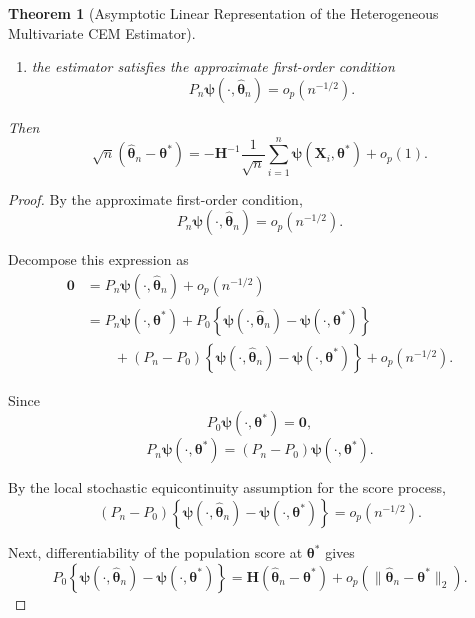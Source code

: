 \documentclass[pdflatex,sn-mathphys-ay]{sn-jnl}%
\let\oldtheta\theta
\renewcommand{\theta}{\boldsymbol{\oldtheta}}
\theoremstyle{thmstyleone}%
\newtheorem{theorem}{Theorem}%
\theoremstyle{thmstyletwo}%
\theoremstyle{thmstylethree}%
\begin{document}
\begin{theorem}[Asymptotic Linear Representation of the Heterogeneous Multivariate CEM Estimator]
\begin{enumerate}
\item
the estimator satisfies the approximate first-order condition
\[
    P_n
    \boldsymbol{\psi}
    (\cdot,\widehat{\boldsymbol{\theta}}_n)
    =
    o_p(n^{-1/2}).
\]

\end{enumerate}

Then
\[
    \sqrt{n}
    \left(
        \widehat{\boldsymbol{\theta}}_n
        -
        \boldsymbol{\theta}^*
    \right)
    =
    -\mathbf{H}^{-1}
    \frac{1}{\sqrt{n}}
    \sum_{i=1}^n
    \boldsymbol{\psi}
    (\mathbf{X}_i,\boldsymbol{\theta}^*)
    +
    o_p(1).
\]

\end{theorem}

\begin{proof}

By the approximate first-order condition,
\[
    P_n
    \boldsymbol{\psi}
    (\cdot,\widehat{\boldsymbol{\theta}}_n)
    =
    o_p(n^{-1/2}).
\]

Decompose this expression as
\begin{align}
    \mathbf{0}
    &=
    P_n
    \boldsymbol{\psi}
    (\cdot,\widehat{\boldsymbol{\theta}}_n)
    +
    o_p(n^{-1/2})
    \nonumber\\
    &=
    P_n
    \boldsymbol{\psi}
    (\cdot,\boldsymbol{\theta}^*)
    +
    P_0
    \left\{
        \boldsymbol{\psi}
        (\cdot,\widehat{\boldsymbol{\theta}}_n)
        -
        \boldsymbol{\psi}
        (\cdot,\boldsymbol{\theta}^*)
    \right\}
    \nonumber\\
    &\qquad
    +
    (P_n-P_0)
    \left\{
        \boldsymbol{\psi}
        (\cdot,\widehat{\boldsymbol{\theta}}_n)
        -
        \boldsymbol{\psi}
        (\cdot,\boldsymbol{\theta}^*)
    \right\}
    +
    o_p(n^{-1/2}).
\end{align}

Since
\[
    P_0
    \boldsymbol{\psi}
    (\cdot,\boldsymbol{\theta}^*)
    =
    \mathbf{0},
\]
\[
    P_n
    \boldsymbol{\psi}
    (\cdot,\boldsymbol{\theta}^*)
    =
    (P_n-P_0)
    \boldsymbol{\psi}
    (\cdot,\boldsymbol{\theta}^*).
\]

By the local stochastic equicontinuity assumption for the score process,
\[
    (P_n-P_0)
    \left\{
        \boldsymbol{\psi}
        (\cdot,\widehat{\boldsymbol{\theta}}_n)
        -
        \boldsymbol{\psi}
        (\cdot,\boldsymbol{\theta}^*)
    \right\}
    =
    o_p(n^{-1/2}).
\]

Next, differentiability of the population score at $ \boldsymbol{\theta}^*$ gives
\[
    P_0
    \left\{
        \boldsymbol{\psi}
        (\cdot,\widehat{\boldsymbol{\theta}}_n)
        -
        \boldsymbol{\psi}
        (\cdot,\boldsymbol{\theta}^*)
    \right\}
    =
    \mathbf{H}
    \left(
        \widehat{\boldsymbol{\theta}}_n
        -
        \boldsymbol{\theta}^*
    \right)
    +
    o_p
    \left(
        \|
            \widehat{\boldsymbol{\theta}}_n
            -
            \boldsymbol{\theta}^*
        \|_2
    \right).
\]


\end{proof}
\end{document}
